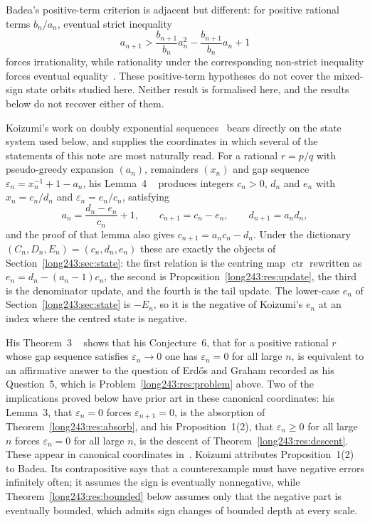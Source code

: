 \documentclass[11pt]{article}
\newcommand{\ctr}{\operatorname{ctr}}
\begin{document}
Badea's positive-term criterion is adjacent but different:
for positive rational terms $b_n/a_n$, eventual strict inequality
\[
 a_{n+1}>\frac{b_{n+1}}{b_n}a_n^2-\frac{b_{n+1}}{b_n}a_n+1
\]
forces irrationality, while rationality under the corresponding non-strict
inequality forces eventual equality~\cite[Theorem~A, p.~313; Cor.~2.2,
p.~316]{badea1993}.  These positive-term hypotheses do not cover the
mixed-sign state orbits studied here.  Neither result is formalised here, and
the results below do not recover either of them.

Koizumi's work on doubly exponential sequences~\cite{koizumi2025} bears
directly on the state system used below, and supplies the coordinates in which
several of the statements of this note are most naturally read.  For a rational
$r=p/q$ with pseudo-greedy expansion $(a_n)$, remainders $(x_n)$ and gap
sequence $\varepsilon_n=x_n^{-1}+1-a_n$, his Lemma~4
~\cite[pp.~11--12]{koizumi2025} produces integers $c_n>0$,
$d_n$ and $e_n$ with $x_n=c_n/d_n$ and $\varepsilon_n=e_n/c_n$, satisfying
\[
 a_n=\frac{d_n-e_n}{c_n}+1,\qquad
 c_{n+1}=c_n-e_n,\qquad
 d_{n+1}=a_nd_n ,
\]
and the proof of that lemma also gives $c_{n+1}=a_nc_n-d_n$.  Under the
dictionary $(C_n,D_n,E_n)=(c_n,d_n,e_n)$ these are exactly the objects of
Section~\ref{long243:sec:state}: the first relation is the centring map $\ctr$ rewritten
as $e_n=d_n-(a_n-1)c_n$, the second is Proposition~\ref{long243:res:update}, the third
is the denominator update, and the fourth is the tail update.  The lower-case
$e_n$ of Section~\ref{long243:sec:state} is $-E_n$, so it is the negative of Koizumi's
$e_n$ at an index where the centred state is negative.

His Theorem~3
~\cite[pp.~12--13]{koizumi2025} shows
that his Conjecture~6, that for a positive rational $r$ whose gap sequence
satisfies $\varepsilon_n\to0$ one has $\varepsilon_n=0$ for all large $n$,
is equivalent to an affirmative answer to the question of Erd\H{o}s and Graham
recorded as his Question~5, which is Problem~\ref{long243:res:problem} above.
Two of the implications proved below have prior art in these canonical
coordinates: his Lemma~3, that $\varepsilon_n=0$ forces $\varepsilon_{n+1}=0$,
is the absorption of Theorem~\ref{long243:res:absorb}, and his Proposition~1(2), that
$\varepsilon_n\ge0$ for all large $n$ forces $\varepsilon_n=0$ for all large
$n$, is the descent of Theorem~\ref{long243:res:descent}.  These appear in canonical
coordinates in~\cite[Lemma~3, p.~10; Prop.~1(2), pp.~14--15]{koizumi2025}.
Koizumi attributes Proposition~1(2) to Badea.  Its contrapositive says that a
counterexample must have negative errors infinitely often; it assumes the sign
is eventually nonnegative, while Theorem~\ref{long243:res:bounded} below assumes only
that the negative part is eventually bounded, which admits sign changes of
bounded depth at every scale.
\end{document}

